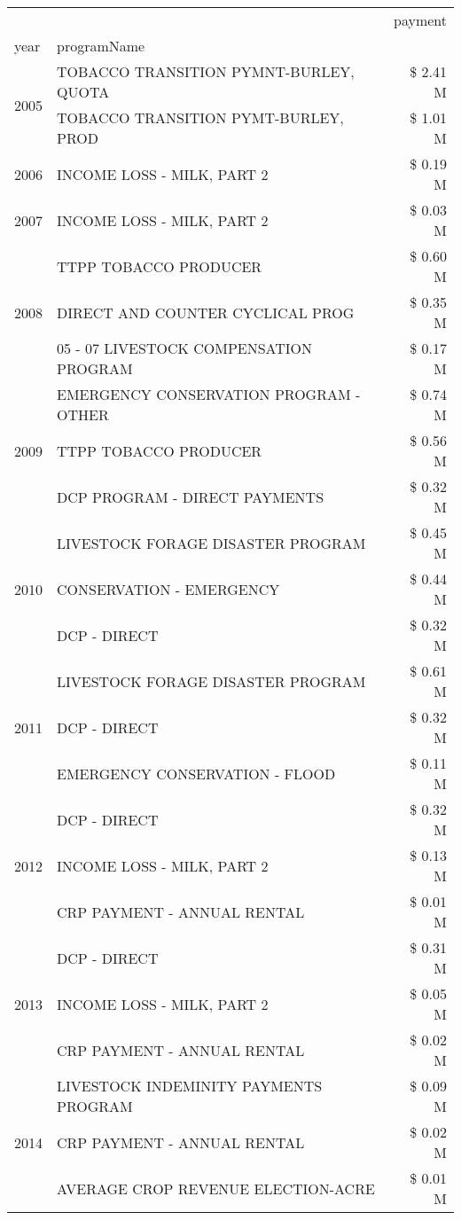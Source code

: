 \begin{tabular}{llr}
\toprule
 &  & payment \\
year & programName &  \\
\midrule
\multirow[t]{2}{*}{2005} & TOBACCO TRANSITION PYMNT-BURLEY, QUOTA & \$ 2.41 M \\
 & TOBACCO TRANSITION PYMT-BURLEY, PROD & \$ 1.01 M \\
\cline{1-3}
2006 & INCOME LOSS - MILK, PART 2 & \$ 0.19 M \\
\cline{1-3}
2007 & INCOME LOSS - MILK, PART 2 & \$ 0.03 M \\
\cline{1-3}
\multirow[t]{3}{*}{2008} & TTPP TOBACCO PRODUCER & \$ 0.60 M \\
 & DIRECT AND COUNTER CYCLICAL PROG & \$ 0.35 M \\
 & 05 - 07 LIVESTOCK COMPENSATION PROGRAM & \$ 0.17 M \\
\cline{1-3}
\multirow[t]{3}{*}{2009} & EMERGENCY CONSERVATION PROGRAM - OTHER & \$ 0.74 M \\
 & TTPP TOBACCO PRODUCER & \$ 0.56 M \\
 & DCP PROGRAM - DIRECT PAYMENTS & \$ 0.32 M \\
\cline{1-3}
\multirow[t]{3}{*}{2010} & LIVESTOCK FORAGE DISASTER PROGRAM & \$ 0.45 M \\
 & CONSERVATION - EMERGENCY & \$ 0.44 M \\
 & DCP - DIRECT & \$ 0.32 M \\
\cline{1-3}
\multirow[t]{3}{*}{2011} & LIVESTOCK FORAGE DISASTER PROGRAM & \$ 0.61 M \\
 & DCP - DIRECT & \$ 0.32 M \\
 & EMERGENCY CONSERVATION - FLOOD & \$ 0.11 M \\
\cline{1-3}
\multirow[t]{3}{*}{2012} & DCP - DIRECT & \$ 0.32 M \\
 & INCOME LOSS - MILK, PART 2 & \$ 0.13 M \\
 & CRP PAYMENT - ANNUAL RENTAL & \$ 0.01 M \\
\cline{1-3}
\multirow[t]{3}{*}{2013} & DCP - DIRECT & \$ 0.31 M \\
 & INCOME LOSS - MILK, PART 2 & \$ 0.05 M \\
 & CRP PAYMENT - ANNUAL RENTAL & \$ 0.02 M \\
\cline{1-3}
\multirow[t]{3}{*}{2014} & LIVESTOCK INDEMINITY PAYMENTS PROGRAM & \$ 0.09 M \\
 & CRP PAYMENT - ANNUAL RENTAL & \$ 0.02 M \\
 & AVERAGE CROP REVENUE ELECTION-ACRE & \$ 0.01 M \\

\end{tabular}
